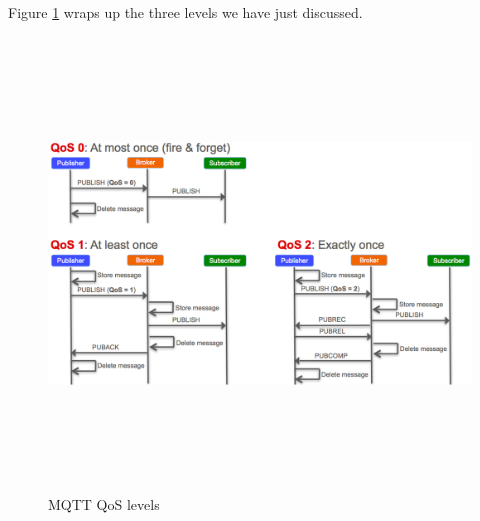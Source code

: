 \documentclass[12pt]{report}
\begin{document}
Figure \ref{fig:qos_levels} wraps up the three levels we have just discussed.

\begin{figure}[H]
\includegraphics[width=12.5cm,height=12cm,keepaspectratio]{qos_levels}
\centering
\caption{MQTT QoS levels}
\label{fig:qos_levels}
\end{figure}
\end{document}
